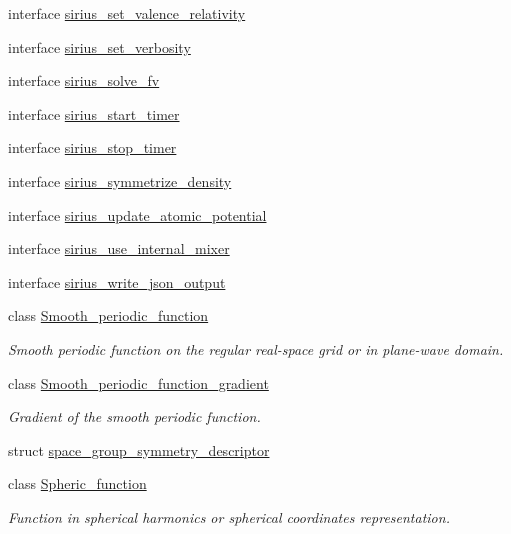 \begin{DoxyCompactItemize}
\item 
interface \hyperlink{interfacesirius_1_1sirius__set__valence__relativity}{sirius\+\_\+set\+\_\+valence\+\_\+relativity}
\item 
interface \hyperlink{interfacesirius_1_1sirius__set__verbosity}{sirius\+\_\+set\+\_\+verbosity}
\item 
interface \hyperlink{interfacesirius_1_1sirius__solve__fv}{sirius\+\_\+solve\+\_\+fv}
\item 
interface \hyperlink{interfacesirius_1_1sirius__start__timer}{sirius\+\_\+start\+\_\+timer}
\item 
interface \hyperlink{interfacesirius_1_1sirius__stop__timer}{sirius\+\_\+stop\+\_\+timer}
\item 
interface \hyperlink{interfacesirius_1_1sirius__symmetrize__density}{sirius\+\_\+symmetrize\+\_\+density}
\item 
interface \hyperlink{interfacesirius_1_1sirius__update__atomic__potential}{sirius\+\_\+update\+\_\+atomic\+\_\+potential}
\item 
interface \hyperlink{interfacesirius_1_1sirius__use__internal__mixer}{sirius\+\_\+use\+\_\+internal\+\_\+mixer}
\item 
interface \hyperlink{interfacesirius_1_1sirius__write__json__output}{sirius\+\_\+write\+\_\+json\+\_\+output}
\item 
class \hyperlink{classsirius_1_1_smooth__periodic__function}{Smooth\+\_\+periodic\+\_\+function}
\begin{DoxyCompactList}\small\item\em Smooth periodic function on the regular real-\/space grid or in plane-\/wave domain. \end{DoxyCompactList}\item 
class \hyperlink{classsirius_1_1_smooth__periodic__function__gradient}{Smooth\+\_\+periodic\+\_\+function\+\_\+gradient}
\begin{DoxyCompactList}\small\item\em Gradient of the smooth periodic function. \end{DoxyCompactList}\item 
struct \hyperlink{structsirius_1_1space__group__symmetry__descriptor}{space\+\_\+group\+\_\+symmetry\+\_\+descriptor}
\item 
class \hyperlink{classsirius_1_1_spheric__function}{Spheric\+\_\+function}
\begin{DoxyCompactList}\small\item\em Function in spherical harmonics or spherical coordinates representation. \end{DoxyCompactList}\item 

\end{DoxyCompactItemize}
